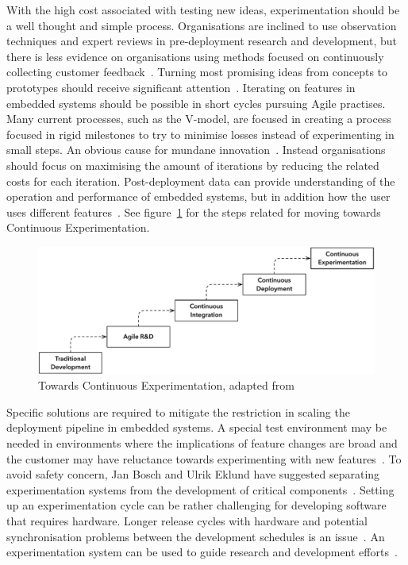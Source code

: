 \documentclass[english]{tktltiki2}
\begin{document}
With the high cost associated with testing new ideas, experimentation should be a well thought and simple process. Organisations are inclined to use observation techniques and expert reviews in pre-deployment research and development, but there is less evidence on organisations using methods focused on continuously collecting customer feedback~\cite{HB14}. Turning most promising ideas from concepts to prototypes should receive significant attention~\cite{BE12}. Iterating on features in embedded systems should be possible in short cycles pursuing Agile practises. Many current processes, such as the V-model, are focused in creating a process focused in rigid milestones to try to minimise losses instead of experimenting in small steps. An obvious cause for mundane innovation~\cite{BE12}. Instead organisations should focus on maximising the amount of iterations by reducing the related costs for each iteration. Post-deployment data can provide understanding of the operation and performance of embedded systems, but in addition how the user uses different features~\cite{BE12, HB14}. See figure~\ref{figure:towards-continuous-experimentation} for the steps related for moving towards Continuous Experimentation.

\begin{figure}[h!]

    \centering

    \includegraphics[width = \textwidth]{figures/towards-continuous-experimentation}

    \caption{Towards Continuous Experimentation, adapted from~\cite{HAB12}}
    \label{figure:towards-continuous-experimentation}

    \vspace{1cm}

\end{figure}

Specific solutions are required to mitigate the restriction in scaling the deployment pipeline in embedded systems. A special test environment may be needed in environments where the implications of feature changes are broad and the customer may have reluctance towards experimenting with new features~\cite{FGM14}. To avoid safety concern, Jan Bosch and Ulrik Eklund have suggested separating experimentation systems from the development of critical components~\cite{BE12}. Setting up an experimentation cycle can be rather challenging for developing software that requires hardware. Longer release cycles with hardware and potential synchronisation problems between the development schedules is an issue~\cite{FGM14}. An experimentation system can be used to guide research and development efforts~\cite{HAB12}.
\end{document}
